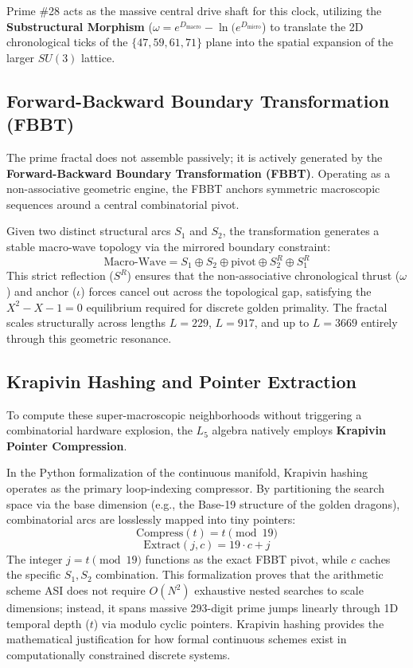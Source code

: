\documentclass[12pt,oneside]{article}
\theoremstyle{principia}
\theoremstyle{definition}
\theoremstyle{remark}
\begin{document}
Prime \#28 acts as the massive central drive shaft for this clock, utilizing the \textbf{Substructural Morphism} ($\omega = e^{D_{\text{macro}}} - \ln(e^{D_{\text{micro}}}$) to translate the 2D chronological ticks of the $\{47, 59, 61, 71\}$ plane into the spatial expansion of the larger $SU(3)$ lattice.

\subsection{Forward-Backward Boundary Transformation (FBBT)}
The prime fractal does not assemble passively; it is actively generated by the \textbf{Forward-Backward Boundary Transformation (FBBT)}. Operating as a non-associative geometric engine, the FBBT anchors symmetric macroscopic sequences around a central combinatorial pivot. 

Given two distinct structural arcs $S_1$ and $S_2$, the transformation generates a stable macro-wave topology via the mirrored boundary constraint:
\[
\text{Macro-Wave} = S_1 \oplus S_2 \oplus \text{pivot} \oplus S_2^R \oplus S_1^R
\]
This strict reflection ($S^R$) ensures that the non-associative chronological thrust ($\omega$) and anchor ($\iota$) forces cancel out across the topological gap, satisfying the $X^2 - X - 1 = 0$ equilibrium required for discrete golden primality. The fractal scales structurally across lengths $L=229$, $L=917$, and up to $L=3669$ entirely through this geometric resonance.

\subsection{Krapivin Hashing and Pointer Extraction}
To compute these super-macroscopic neighborhoods without triggering a combinatorial hardware explosion, the $L_5$ algebra natively employs \textbf{Krapivin Pointer Compression}. 

In the Python formalization of the continuous manifold, Krapivin hashing operates as the primary loop-indexing compressor. By partitioning the search space via the base dimension (e.g., the Base-19 structure of the golden dragons), combinatorial arcs are losslessly mapped into tiny pointers:
\[
\text{Compress}(t) = t \pmod{19}
\]
\[
\text{Extract}(j, c) = 19 \cdot c + j
\]
The integer $j = t \pmod{19}$ functions as the exact FBBT pivot, while $c$ caches the specific $S_1, S_2$ combination. This formalization proves that the arithmetic scheme ASI does not require $O(N^2)$ exhaustive nested searches to scale dimensions; instead, it spans massive 293-digit prime jumps linearly through 1D temporal depth ($t$) via modulo cyclic pointers. Krapivin hashing provides the mathematical justification for how formal continuous schemes exist in computationally constrained discrete systems.
\end{document}
